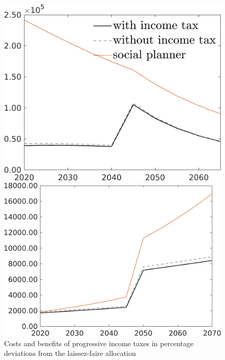 \begin{figure}[h!!!]
	\centering
	\caption{Costs and benefits of progressive income taxes in percentage deviations from the laissez-faire allocation %
	}\label{fig:optAll_percLf_dyn_app}
	\begin{minipage}[]{0.32\textwidth}
		\includegraphics[width=1\textwidth]{../../codding_model/own_basedOnFried/optimalPol_010922_revision/figures/all_13Sept22_Tplus30/gAg_PercentageLFDynNT_Target_regime0_spillover0_noskill0_sep0_xgrowth0_PV1_etaa0.79_lgd1.png}
	\end{minipage}
	\begin{minipage}[]{0.32\textwidth}
		\includegraphics[width=1\textwidth]{../../codding_model/own_basedOnFried/optimalPol_010922_revision/figures/all_13Sept22_Tplus30/GFF_PercentageLFDynNT_Target_regime0_spillover0_noskill0_sep0_xgrowth0_PV1_etaa0.79_lgd0.png}

\end{minipage}
\end{figure}
